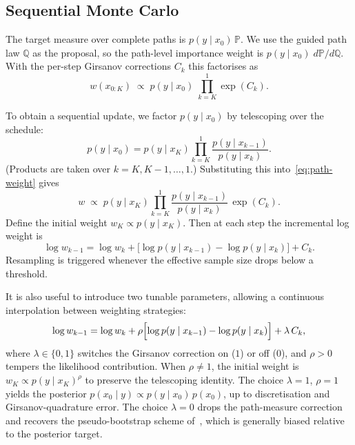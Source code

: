 \documentclass[11pt]{article}
\newcommand{\bbP}{\mathbb{P}}
\newcommand{\bbQ}{\mathbb{Q}}
\begin{document}
\subsection{Sequential Monte Carlo}

The target measure over complete paths is $p(y \mid x_0)\,\bbP$.
We use the guided path law $\bbQ$ as the proposal, so the
path-level importance weight is $p(y \mid x_0)\;d\bbP/d\bbQ$.
With the per-step Girsanov corrections $C_k$ this factorises as
\begin{equation}\label{eq:path-weight}
  w(x_{0:K}) \;\propto\; p(y \mid x_0)\;
                            \prod_{k=K}^{1} \exp(C_k).
\end{equation}

To obtain a sequential update, we factor $p(y \mid x_0)$ by telescoping
over the schedule:
\begin{equation}\label{eq:telescope}
  p(y \mid x_0)
    = p(y \mid x_K)
      \prod_{k=K}^{1} \frac{p(y \mid x_{k-1})}{p(y \mid x_k)}.
\end{equation}
(Products are taken over $k = K, K-1, \dots, 1$.)
Substituting this into~\eqref{eq:path-weight} gives
\begin{equation}\label{eq:weight-product}
  w \;\propto\; p(y \mid x_K)
                  \prod_{k=K}^{1}
                    \frac{p(y \mid x_{k-1})}{p(y \mid x_k)}\,
                    \exp(C_k).
\end{equation}
Define the initial weight $w_K \propto p(y \mid x_K)$.
Then at each step the incremental log weight is
\begin{equation}\label{eq:unified-weight-raw}
  \log w_{k-1}
    = \log w_k
      + \bigl[\log p(y \mid x_{k-1}) - \log p(y \mid x_k)\bigr]
      + C_k.
\end{equation}
Resampling is triggered whenever the effective sample size drops below a threshold.

It is also useful to introduce two tunable parameters,
allowing a continuous interpolation between weighting strategies:
\begin{equation}\label{eq:unified-weight}
  \log w_{k-1}
    = \log w_k
      + \rho\Bigl[\log p(y \mid x_{k-1}) - \log p(y \mid x_k)\Bigr]
      + \lambda\,C_k,
\end{equation}
where $\lambda \in \{0,1\}$ switches the Girsanov correction on ($1$) or off ($0$),
and $\rho > 0$ tempers the likelihood contribution.
When $\rho \neq 1$, the initial weight is $w_K \propto p(y \mid x_K)^\rho$
to preserve the telescoping identity.
The choice $\lambda = 1$, $\rho = 1$ yields the posterior
$p(x_0\mid y) \propto p(y\mid x_0)\,p(x_0)$, up to discretisation
and Girsanov-quadrature error.
The choice $\lambda = 0$ drops the path-measure correction and recovers the
pseudo-bootstrap scheme of~\citet{millard2026particle}, which is generally biased
relative to the posterior target.
\end{document}
